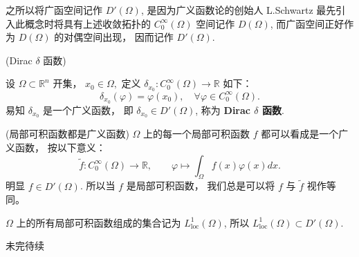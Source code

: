之所以将广函空间记作 $D'(\Omega)$, 是因为广义函数论的创始人 L.Schwartz 最先引入此概念时将具有上述收敛拓扑的
$C_{0}^{\infty}(\Omega)$ 空间记作 $D(\Omega)$, 而广函空间正好作为 $D(\Omega)$
的对偶空间出现， 因而记作 $D'(\Omega)$. 
\begin{example}{(Dirac $\delta$ 函数)
}

设 $\Omega\subset\mathbb{R}^{n}$ 开集， $x_{0}\in\Omega,$ 定义 $\delta_{x_{0}}:C_{0}^{\infty}(\Omega)\rightarrow\mathbb{R}$
如下： 
\[
\delta_{x_{0}}(\varphi)=\varphi(x_{0}),\quad\forall\varphi\in C_{0}^{\infty}(\Omega).
\]
易知 $\delta_{x_{0}}$ 是一个广义函数， 即 $\delta_{x_{0}}\in D'(\Omega)$, 称为
\textbf{Dirac $\delta$ 函数}. 
\end{example}

\begin{example}{(局部可积函数都是广义函数)}
$\Omega$ 上的每一个局部可积函数 $f$ 都可以看成是一个广义函数， 按以下意义： 
\[
\tilde{f}:C_{0}^{\infty}(\Omega)\rightarrow\mathbb{R},\quad\quad\varphi\mapsto{\displaystyle \int_{\Omega}f(x)\varphi(x)dx}.
\]
明显 $f\in D'(\Omega)$. 所以当 $f$ 是局部可积函数， 我们总是可以将 $f$ 与 $\tilde{f}$
视作等同。 

$\Omega$ 上的所有局部可积函数组成的集合记为 $L_{\mathrm{loc}}^1(\Omega)$, 所以
$L_{\mathrm{loc}}^1(\Omega)\subset D'(\Omega).$
\end{example}

未完待续